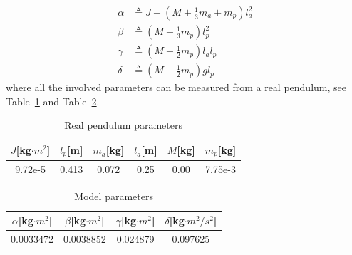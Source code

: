 \documentclass{LTHtwocol} %
\begin{document}
\begin{equation}
\begin{aligned}
    \alpha &\triangleq J + (M + \frac{1}{3} m_a + m_p)l^2_a \\
    \beta &\triangleq (M + \frac{1}{3} m_p)l^2_p \\
    \gamma &\triangleq (M +\frac{1}{2} m_p)l_a l_p \\
    \delta &\triangleq (M + \frac{1}{2} m_p)gl_p 
\end{aligned}
\end{equation}
where all the involved parameters can be measured from a real pendulum\cite{2efe5c5060d9449683ba4bc412e9acef}, see Table~\ref{tab:pendulumparameters} and Table~\ref{tab:modelparameters}.

\begin{table}[t]
	\centering
	\caption{Real pendulum parameters}
	\label{tab:pendulumparameters}
	\begin{tabular}{cccccc} %
		\toprule
        $J$[kg$\cdot m^2$]     & $l_p$[m]  & $m_a$[kg] & $l_a$[m] & $M$[kg]     & $m_p$[kg]         \\ 
        \midrule 
        9.72e-5 & 0.413 & 0.072 & 0.25 & 0.00 & 7.75e-3  \\
	\end{tabular}
\end{table}

\begin{table}[t]
	\centering
	\caption{Model parameters}
	\label{tab:modelparameters}
	\begin{tabular}{cccc} %
		\toprule
        $\alpha$[kg$\cdot m^2$] & $\beta$[kg$\cdot m^2$] & $\gamma$[kg$\cdot m^2$] & $\delta$[kg$\cdot m^2/s^2$]      \\ 
        \midrule 
        0.0033472 & 0.0038852 & 0.024879 & 0.097625  \\
	\end{tabular}
\end{table}
\end{document}
